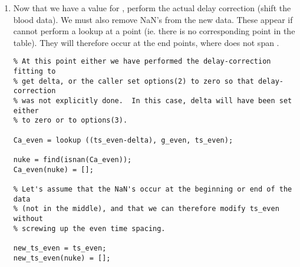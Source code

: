 \begin{enumerate}
\begin{verbatim}
      options(2) = 1;
      options(3) = 1;

      final = fmins ('fit_b_curve', init, options, [], ...
                shifted_g_even (g_select), ts_even (g_select), ...
                A, FrameTimes, FrameLengths);

      params (i,:) = final;
      rss(i) = fit_b_curve (final, ...
                 shifted_g_even(g_select), ts_even(g_select), ...
                 A, FrameTimes, FrameLengths);
      init = final;
      if (progress)
         fprintf ('; final = [%g %g %g]; residual = %g\n', final, rss (i));

         if (progress >= 2)
            plot (MidFTimes, ...
             b_curve(final, shifted_g_even(g_select), ts_even(g_select), ...
             A, FrameTimes, FrameLengths));
            drawnow;
         end      % if graphical progress
      end      % if any progress
   end      % for delta

   [err, where] = min (rss);            % find smallest residual
   delta = deltas (where);              % delta for best fit

end      % if do_delay
\end{verbatim}

\item Now that we have a value for , perform the actual
delay correction (shift the blood data).  We must also remove NaN's
from the new data.  These appear if  cannot perform a
lookup at a point (ie. there is no corresponding point in the table).
They will therefore occur at the end points, where 
does not span .
\begin{verbatim}
% At this point either we have performed the delay-correction fitting to 
% get delta, or the caller set options(2) to zero so that delay-correction
% was not explicitly done.  In this case, delta will have been set either
% to zero or to options(3).

Ca_even = lookup ((ts_even-delta), g_even, ts_even);

nuke = find(isnan(Ca_even));
Ca_even(nuke) = [];

% Let's assume that the NaN's occur at the beginning or end of the data
% (not in the middle), and that we can therefore modify ts_even without
% screwing up the even time spacing.

new_ts_even = ts_even;
new_ts_even(nuke) = [];
\end{verbatim}
\end{enumerate}


